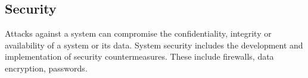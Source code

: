 \subsection{Security}

Attacks against a system can compromise the confidentiality, integrity or availability of a system or its data.
System security includes the development and implementation of security countermeasures. These include firewalls, data encryption, passwords.